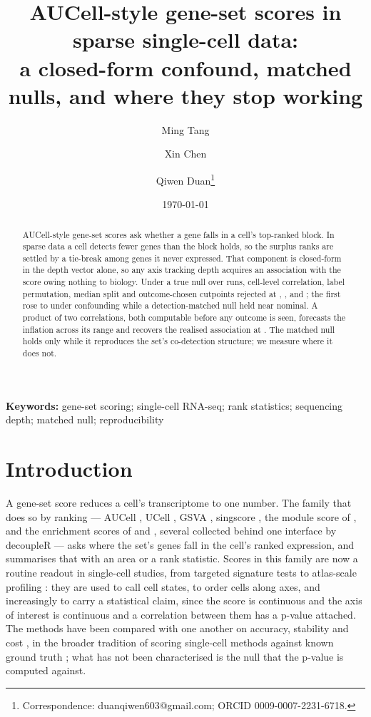 \documentclass[11pt]{article}
\title{\bfseries AUCell-style gene-set scores in sparse single-cell data:\\ a closed-form confound, matched nulls, and where they stop working}
\author[1]{Ming Tang}
\author[1]{Xin Chen}
\author[1]{Qiwen Duan\thanks{Correspondence: duanqiwen603@gmail.com;
ORCID 0009-0007-2231-6718.}}
\affil[1]{\small Department of Radiation Oncology, Shenzhen Bao'an People's
Hospital, The Second Affiliated Hospital of Shenzhen University, Shenzhen,
China. Correspondence and code: see Code availability.}
\date{\today}
\begin{document}
\maketitle

\begin{abstract}
\noindent
AUCell-style gene-set scores ask whether a gene falls in a cell's top-ranked
block. In sparse data a cell detects fewer genes than the block holds, so the
surplus ranks are settled by a tie-break among genes it never expressed. That
component is closed-form in the depth vector alone, so any axis tracking depth
acquires an association with the score owing nothing to biology. Under a true
null over \gridARuns{} runs, cell-level correlation, label permutation, median
split and outcome-chosen cutpoints rejected at \cellcorRate, \permutedRate,
\cutmedRate{} and \cutoptRate{}; the first rose to \confCCellcor{} under
confounding while a detection-matched null held near nominal. A product of two
correlations, both computable before any outcome is seen, forecasts the
inflation across its range and recovers the realised association at
\impliedCorr{}. The matched null holds only while it reproduces the set's
co-detection structure; we measure where it does not.
\end{abstract}

\vspace{0.3em}
\noindent\textbf{Keywords:} gene-set scoring; single-cell RNA-seq; rank
statistics; sequencing depth; matched null; reproducibility

\section{Introduction}

A gene-set score reduces a cell's transcriptome to one number. The family that
does so by ranking --- AUCell \citep{aibar2017}, UCell \citep{andreatta2021},
GSVA \citep{hanzelmann2013}, singscore \citep{foroutan2018}, the module score of
\citet{tirosh2016}, and the enrichment scores of \citet{barbie2009} and
\citet{subramanian2005}, several collected behind one interface by
decoupleR \citep{badia2022} --- asks
where the set's genes fall in the cell's ranked expression, and summarises that
with an area or a rank statistic. Scores in this family are now a routine
readout in single-cell studies, from targeted signature tests to
atlas-scale profiling \citep{regev2017}: they are used to call cell states, to order
cells along axes, and increasingly to carry a statistical claim, since the score
is continuous and the axis of interest is continuous and a correlation between
them has a p-value attached. The methods have been compared with one another on
accuracy, stability and cost \citep{wang2024scps}, in the broader tradition of
scoring single-cell methods against known ground truth \citep{soneson2018};
what has not been
characterised is the null that the p-value is computed against.
\end{document}
